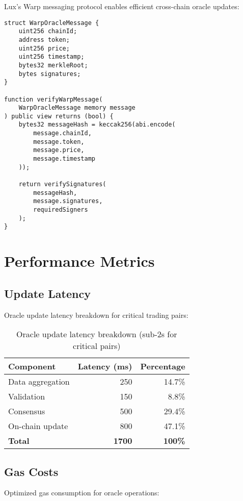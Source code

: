\documentclass[11pt]{article}
\begin{document}
Lux's Warp messaging protocol enables efficient cross-chain oracle updates:

\begin{lstlisting}[caption={Warp Oracle Message Structure}]
struct WarpOracleMessage {
    uint256 chainId;
    address token;
    uint256 price;
    uint256 timestamp;
    bytes32 merkleRoot;
    bytes signatures;
}

function verifyWarpMessage(
    WarpOracleMessage memory message
) public view returns (bool) {
    bytes32 messageHash = keccak256(abi.encode(
        message.chainId,
        message.token,
        message.price,
        message.timestamp
    ));
    
    return verifySignatures(
        messageHash,
        message.signatures,
        requiredSigners
    );
}
\end{lstlisting}

\section{Performance Metrics}

\subsection{Update Latency}

Oracle update latency breakdown for critical trading pairs:

\begin{table}[h]
\centering
\begin{tabular}{lrr}
\toprule
\textbf{Component} & \textbf{Latency (ms)} & \textbf{Percentage} \\
\midrule
Data aggregation & 250 & 14.7\% \\
Validation & 150 & 8.8\% \\
Consensus & 500 & 29.4\% \\
On-chain update & 800 & 47.1\% \\
\midrule
\textbf{Total} & \textbf{1700} & \textbf{100\%} \\
\bottomrule
\end{tabular}
\caption{Oracle update latency breakdown (sub-2s for critical pairs)}
\end{table}

\subsection{Gas Costs}

Optimized gas consumption for oracle operations:
\end{document}
